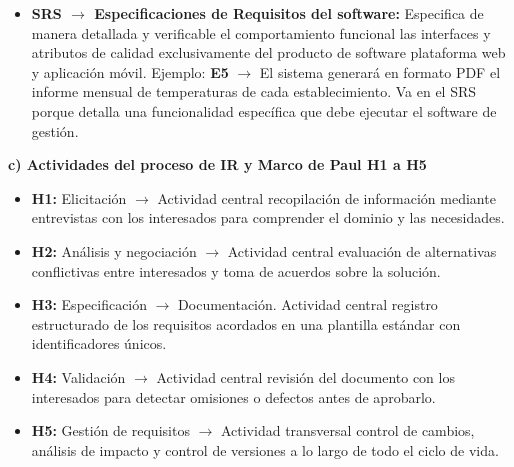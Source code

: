 \documentclass[11pt]{article}
\begin{document}
\begin{cajaclave}[title={Respuesta T1 (Transcripción fiel de las hojas manuscritas)}]
\begin{itemize}[leftmargin=16pt,itemsep=2pt]
		\item \textbf{SRS $\rightarrow$ Especificaciones de Requisitos del software:} Especifica de manera detallada y verificable el comportamiento funcional las interfaces y atributos de calidad exclusivamente del producto de software plataforma web y aplicación móvil. Ejemplo: \textbf{E5} $\rightarrow$ El sistema generará en formato PDF el informe mensual de temperaturas de cada establecimiento. Va en el SRS porque detalla una funcionalidad específica que debe ejecutar el software de gestión.

	\end{itemize}\par\medskip



	\textbf{c) Actividades del proceso de IR y Marco de Paul H1 a H5}

	\begin{itemize}[leftmargin=16pt,itemsep=2pt]

		\item \textbf{H1:} Elicitación $\rightarrow$ Actividad central recopilación de información mediante entrevistas con los interesados para comprender el dominio y las necesidades.

		\item \textbf{H2:} Análisis y negociación $\rightarrow$ Actividad central evaluación de alternativas conflictivas entre interesados y toma de acuerdos sobre la solución.

		\item \textbf{H3:} Especificación $\rightarrow$ Documentación. Actividad central registro estructurado de los requisitos acordados en una plantilla estándar con identificadores únicos.

		\item \textbf{H4:} Validación $\rightarrow$ Actividad central revisión del documento con los interesados para detectar omisiones o defectos antes de aprobarlo.

		\item \textbf{H5:} Gestión de requisitos $\rightarrow$ Actividad transversal control de cambios, análisis de impacto y control de versiones a lo largo de todo el ciclo de vida.

	\end{itemize}

\end{cajaclave}
\end{document}
